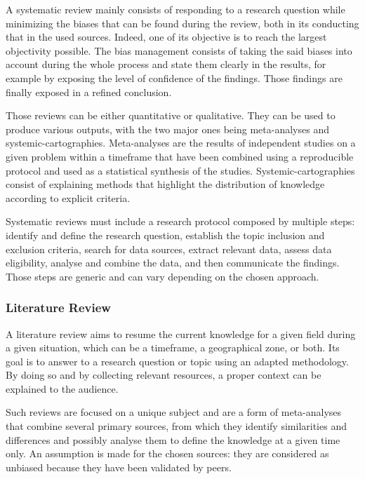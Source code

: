 A systematic review mainly consists of responding to a research question while minimizing the biases that can be found during the review, both in its conducting that in the used sources. Indeed, one of its objective is to reach the largest objectivity possible. The bias management consists of taking the said biases into account during the whole process and state them clearly in the results, for example by exposing the level of confidence of the findings. Those findings are finally exposed in a refined conclusion.

Those reviews can be either quantitative or qualitative. They can be used to produce various outputs, with the two major ones being meta-analyses and systemic-cartographies. Meta-analyses are the results of independent studies on a given problem within a timeframe that have been combined using a reproducible protocol and used as a statistical synthesis of the studies. Systemic-cartographies consist of explaining methods that highlight the distribution of knowledge according to explicit criteria.

Systematic reviews must include a research protocol composed by multiple steps: identify and define the research question, establish the topic inclusion and exclusion criteria, search for data sources, extract relevant data, assess data eligibility, analyse and combine the data, and then communicate the findings. Those steps are generic and can vary depending on the chosen approach.

\subsubsection{Literature Review}
\label{subsubsec:state_methodology_approach_literature}

A literature review aims to resume the current knowledge for a given field during a given situation, which can be a timeframe, a geographical zone, or both. Its goal is to answer to a research question or topic using an adapted methodology. By doing so and by collecting relevant resources, a proper context can be explained to the audience. 

Such reviews are focused on a unique subject and are a form of meta-analyses that combine several primary sources, from which they identify similarities and differences and possibly analyse them to define the knowledge at a given time only. An assumption is made for the chosen sources: they are considered as unbiased because they have been validated by peers.

